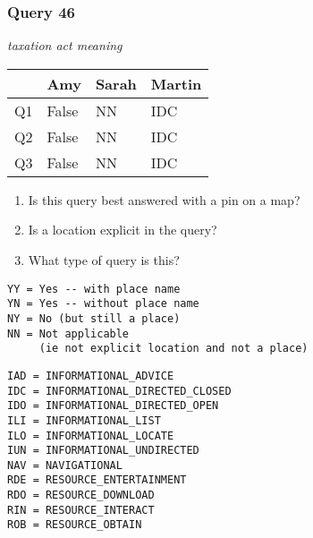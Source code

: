 \begin{frame}[fragile]
\frametitle{Query 46}
\vspace{1em}

\emph{taxation act meaning}

\vfill

\begin{table}
  \centering
  \begin{tabular}{ l l l l }
    & \textbf{Amy} & \textbf{Sarah} & \textbf{Martin}\\
    \toprule
    Q1 & False & NN & IDC\\
Q2 & False & NN & IDC\\
Q3 & False & NN & IDC\\
    \bottomrule
  \end{tabular}
\end{table}

\vfill

\tiny{

\begin{enumerate}
\item Is this query best answered with a pin on a map?
\item Is a location explicit in the query?
\item What type of query is this?
\end{enumerate}

\vfill

\begin{multicols}{2}
\begin{verbatim}
YY = Yes -- with place name
YN = Yes -- without place name
NY = No (but still a place)
NN = Not applicable 
     (ie not explicit location and not a place)
\end{verbatim}

\columnbreak
\begin{verbatim}
IAD = INFORMATIONAL_ADVICE
IDC = INFORMATIONAL_DIRECTED_CLOSED
IDO = INFORMATIONAL_DIRECTED_OPEN
ILI = INFORMATIONAL_LIST
ILO = INFORMATIONAL_LOCATE
IUN = INFORMATIONAL_UNDIRECTED
NAV = NAVIGATIONAL
RDE = RESOURCE_ENTERTAINMENT
RDO = RESOURCE_DOWNLOAD
RIN = RESOURCE_INTERACT
ROB = RESOURCE_OBTAIN
\end{verbatim}
\end{multicols}
}

\end{frame}


